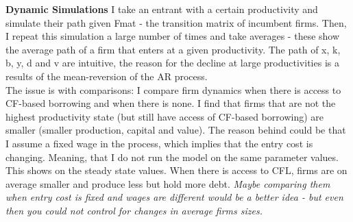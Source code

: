 \documentclass[12pt]{article}
\begin{document}
\textbf{Dynamic Simulations} 
I take an entrant with a certain productivity and simulate their path given Fmat - the transition matrix of incumbent firms. Then, I repeat this simulation a large number of times and take averages - these show the average path of a firm that enters at a given productivity. The path of x, k, b, y, d and v  are intuitive, the reason for the decline at large productivities is a results of the mean-reversion of the AR process. \vspace{3mm} \\
The issue is with comparisons: I compare firm dynamics when there is access to CF-based borrowing and when there is none. I find that firms that are not the highest productivity state (but still have access of CF-based borrowing) are smaller (smaller production, capital and value). The reason behind could be that I assume a fixed wage in the process, which implies that the entry cost is changing. Meaning, that I do not run the model on the same parameter values. This shows on the steady state values.  When there is access to CFL, firms are on average smaller and produce less but hold more debt. \textit{Maybe comparing them when entry cost is fixed and wages are different would be a better idea - but even then you could not control for changes in average firms sizes.} 
\end{document}
